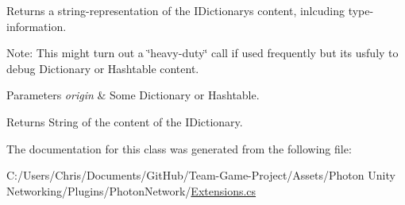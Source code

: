 Returns a string-\/representation of the I\+Dictionary\textquotesingle{}s content, inlcuding type-\/information. 

Note\+: This might turn out a \char`\"{}heavy-\/duty\char`\"{} call if used frequently but it\textquotesingle{}s usfuly to debug Dictionary or Hashtable content. 


\begin{DoxyParams}{Parameters}
{\em origin} & Some Dictionary or Hashtable.\\
\hline
\end{DoxyParams}
\begin{DoxyReturn}{Returns}
String of the content of the I\+Dictionary.
\end{DoxyReturn}


The documentation for this class was generated from the following file\+:\begin{DoxyCompactItemize}
\item 
C\+:/\+Users/\+Chris/\+Documents/\+Git\+Hub/\+Team-\/\+Game-\/\+Project/\+Assets/\+Photon Unity Networking/\+Plugins/\+Photon\+Network/\hyperlink{_extensions_8cs}{Extensions.\+cs}\end{DoxyCompactItemize}
